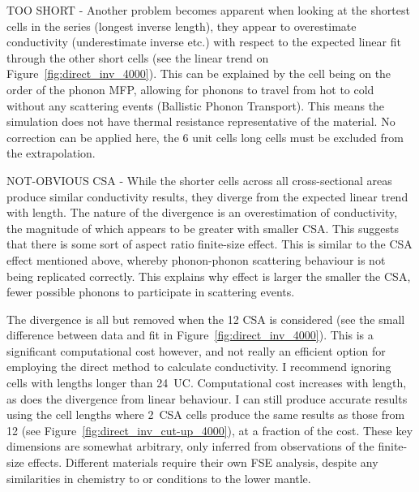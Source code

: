 TOO SHORT - Another problem becomes apparent when looking at the shortest cells in the series (longest inverse length), they appear to overestimate conductivity (underestimate inverse etc.) with respect to the expected linear fit through the other short cells (see the linear trend on Figure~\ref{fig:direct_inv_4000}). This can be explained by the cell being on the order of the phonon MFP, allowing for phonons to travel from hot to cold without any scattering events (Ballistic Phonon Transport). This means the simulation does not have thermal resistance representative of the material. No correction can be applied here, the 6 unit cells long cells must be excluded from the extrapolation. %


NOT-OBVIOUS CSA - While the shorter cells across all cross-sectional areas produce similar conductivity results, they diverge from the expected linear trend with length. The nature of the divergence is an overestimation of conductivity, the magnitude of which appears to be greater with smaller CSA. This suggests that there is some sort of aspect ratio finite-size effect. This is similar to the CSA effect mentioned above, whereby phonon-phonon scattering behaviour is not being replicated correctly. This explains why effect is larger the smaller the CSA, fewer possible phonons to participate in scattering events. 

The divergence is all but removed when the 12 CSA is considered (see the small difference between data and fit in Figure~\ref{fig:direct_inv_4000}). This is a significant computational cost however, and not really an efficient option for employing the direct method to calculate conductivity. I recommend ignoring cells with lengths longer than 24~UC. Computational cost increases with length, as does the divergence from linear behaviour. I can still produce accurate results using the cell lengths where 2~CSA cells produce the same results as those from 12 (see Figure~\ref{fig:direct_inv_cut-up_4000}), at a fraction of the cost. These key dimensions are somewhat arbitrary, only inferred from observations of the finite-size effects. Different materials require their own FSE analysis, despite any similarities in chemistry to \bdgs or conditions to the lower mantle.

